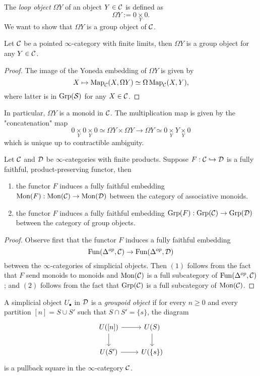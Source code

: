 The \emph{loop object} $\Omega Y$ of an object $Y\in {\mathcal{C}}$ is defined as
$$
\Omega Y:=0 \underset { Y }{\times } 0.
$$
We want to show that $\Omega Y$ is a group object of ${\mathcal{C}}$. 
\begin{lemma}
\label{Loop of an object is a group}
    Let ${\mathcal{C}}$ be a pointed $\infty$-category with finite limits, then $\Omega Y$ is a group object for any $Y\in {\mathcal{C}}$.
\end{lemma}
\begin{proof}
    The image of the Yoneda embedding of $\Omega Y$ is given by 
    $$
    X \mapsto \operatorname{Map}_{{\mathcal{C}}}(X, \Omega Y)\simeq \Omega \operatorname{Map}_{{\mathcal{C}}}(X, Y),
    $$
    where latter is in $\operatorname{Grp}(\operatorname{\mathcal{S}})$ for any $X\in {\mathcal{C}}$.
\end{proof}
\begin{remark}
In particular, $\Omega Y$ is a monoid in ${\mathcal{C}}$. The multiplication map is given by the "concatenation" map
$$
0 \underset { Y }{\times } 0 \underset { Y }{\times } 0
\simeq\Omega Y\times \Omega Y\rightarrow \Omega Y\simeq 0\underset{Y}{\times}Y\underset{Y}{\times} 0 
$$
which is unique up to contractible ambiguity. 
\end{remark}


\begin{proposition}
\label{induced fully faithfulness on group objects}
Let ${\mathcal{C}}$ and ${\mathcal{D}}$ be $\infty$-categories with finite products. Suppose $F:{\mathcal{C}} \hookrightarrow {\mathcal{D}}$ is a fully faithful, product-preserving functor, then
	\begin{enumerate}[(1)]
		\item the functor $F$ induces a fully faithful embedding $\operatorname{Mon}(F):\operatorname{Mon}({\mathcal{C}})\to \operatorname{Mon}({\mathcal{D}})$ between the category of associative monoids.
		\item the functor $F$ induces a fully faithful embedding $\operatorname{Grp}(F):\operatorname{Grp}({\mathcal{C}})\to \operatorname{Grp}({\mathcal{D}})$ between the category of group objects.
	\end{enumerate}
\end{proposition}
\begin{proof}
	Observe first that the functor $F$ induces a fully faithful embedding 
	$$
	\operatorname{Fun}(\Delta^{op},{\mathcal{C}})\to \operatorname{Fun}(\Delta^{op},{\mathcal{D}})
	$$ between the $\infty$-categories of simplicial objects.
	Then $(1)$ follows from the fact that $F$ send monoids to monoids and $\operatorname{Mon}({\mathcal{C}})$ is a full subcategory of $\operatorname{Fun}(\Delta^{op},{\mathcal{C}})$; and $(2)$ follows from the fact that $\operatorname{Grp}({\mathcal{C}})$ is a full subcategory of $\operatorname{Mon}({\mathcal{C}})$.
\end{proof}


\begin{definition}
	\cite[Definition 6.1.2.7.]{HTT}
	A simplicial object $U_{\bullet}$ in ${\mathcal{D}}$ is a \textit{groupoid object} if for every $n\geq 0$ and every partition $[n]=S\cup S'$ such that $S\cap S'=\{s\}$, the diagram
	\[
	\begin{tikzcd}
		U([n]) \arrow[r] \arrow[d] & U(S) \arrow[d]\\
		U(S') \arrow[r]    & U(\{s\}) 
	\end{tikzcd}
	\]
	is a pullback square in the $\infty$-category ${\mathcal{C}}$.
\end{definition}


